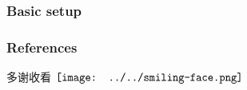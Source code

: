 \documentclass[16pt]{beamer}
\newcommand{\cc}[2]{#1}
\newcommand{\cc}[2]{#2}
\newcommand{\smiley}{$\vcenter{\hbox{\texttt{[image: ../../smiling-face.png]}}}$}
\begin{document}
\begin{frame}
\frametitle{Basic setup}

\end{frame}

\begin{frame}
\frametitle{References}
\cc{多谢收看}{Thanks for watching} \smiley \\
\printbibliography
\end{frame}
\end{document}

